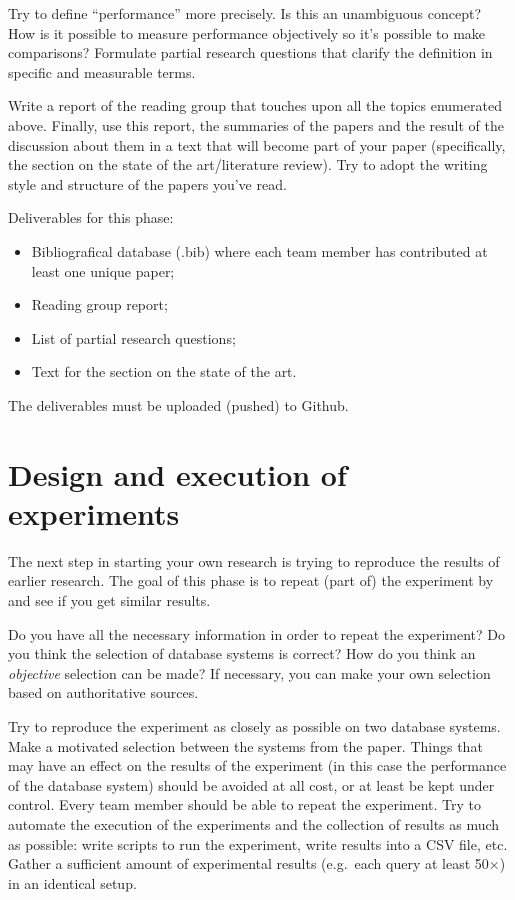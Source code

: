 \documentclass[fleqn,10pt]{artikeltin}
\begin{document}
Try to define ``performance'' more precisely. Is this an unambiguous concept? How is it possible to measure performance objectively so it's possible to make comparisons? Formulate partial research questions that clarify the definition in specific and measurable terms.

Write a report of the reading group that touches upon all the topics enumerated above. Finally, use this report, the summaries of the papers and the result of the discussion about them in a text that will become part of your paper (specifically, the section on the state of the art/literature review). Try to adopt the writing style and structure of the papers you've read.

Deliverables for this phase:

\begin{itemize}
	\item Bibliografical database (.bib) where each team member has contributed at least one unique paper;
	\item Reading group report;
	\item List of partial research questions;
	\item Text for the section on the state of the art.
\end{itemize}
The deliverables must be uploaded (pushed) to Github.

\section{Design and execution of experiments}
\label{sec:experiments}

The next step in starting your own research is trying to reproduce the results of earlier research. The goal of this phase is to repeat (part of) the experiment by~\textcite{Bassil2012} and see if you get similar results.

Do you have all the necessary information in order to repeat the experiment? Do you think the selection of database systems is correct? How do you think an \emph{objective} selection can be made? If necessary, you can make your own selection based on authoritative sources.

Try to reproduce the experiment as closely as possible on two database systems. Make a motivated selection between the systems from the paper. Things that may have an effect on the results of the experiment (in this case the performance of the database system) should be avoided at all cost, or at least be kept under control. Every team member should be able to repeat the experiment. Try to automate the execution of the experiments and the collection of results as much as possible: write scripts to run the experiment, write results into a CSV file, etc. Gather a sufficient amount of experimental results (e.g.~each query at least 50$\times$) in an identical setup.
\end{document}
